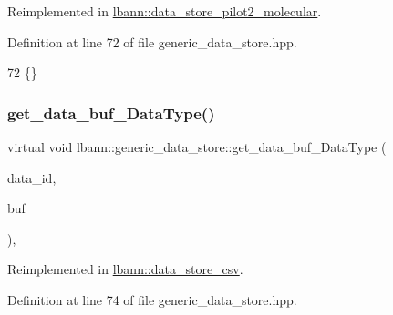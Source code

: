 Reimplemented in \hyperlink{classlbann_1_1data__store__pilot2__molecular_ab0f82fb7fdec7779bbb693e06a206127}{lbann\+::data\+\_\+store\+\_\+pilot2\+\_\+molecular}.



Definition at line 72 of file generic\+\_\+data\+\_\+store.\+hpp.


\begin{DoxyCode}
72 \{\}
\end{DoxyCode}
\mbox{\label{classlbann_1_1generic__data__store_ab3f8b7fe6d6631059d92714d4277a983}} 
\subsubsection{\texorpdfstring{get\+\_\+data\+\_\+buf\+\_\+\+Data\+Type()}{get\_data\_buf\_DataType()}}
{\footnotesize\ttfamily virtual void lbann\+::generic\+\_\+data\+\_\+store\+::get\+\_\+data\+\_\+buf\+\_\+\+Data\+Type (\begin{DoxyParamCaption}\item[{int}]{data\+\_\+id,  }\item[{std\+::vector$<$ Data\+Type $>$ $\ast$\&}]{buf }\end{DoxyParamCaption})\hspace{0.3cm}{\ttfamily [inline]}, {\ttfamily [virtual]}}



Reimplemented in \hyperlink{classlbann_1_1data__store__csv_a3125cf637d40e8908c68bb74690f06da}{lbann\+::data\+\_\+store\+\_\+csv}.



Definition at line 74 of file generic\+\_\+data\+\_\+store.\+hpp.


